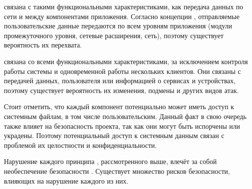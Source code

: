 %
 связана с такими функциональными характеристиками, как передача данных по сети и между компонентами приложения. 
%
Согласно концепции , отправляемые пользовательские данные передаются по всем уровням приложения (модули промежуточного уровня, сетевые расширения, сеть), поэтому существует вероятность их перехвата.

%
 связана со всеми функциональными характеристиками, за исключением контроля работы системы и одновременной работы нескольких клиентов. 
%
Они связаны с передачей данных, пользователя или информацией о сервисах и устройствах, поэтому существует вероятность их изменения, подмены и других видов атак.

%
Стоит отметить, что каждый компонент  потенциально может иметь доступ к системным файлам, в том числе пользовательским. 
%
Данный факт в свою очередь также влияет на безопасность проекта, так как они могут быть испорчены или украдены. 
%
Поэтому потенциальный доступ к системным данным связан с проблемой их целостности и конфиденциальности. 

%
Нарушение каждого принципа , рассмотренного выше, влечёт за собой необеспечение безопасности . 
%
Существует множество рисков безопасности, влияющих на нарушение каждого из них.